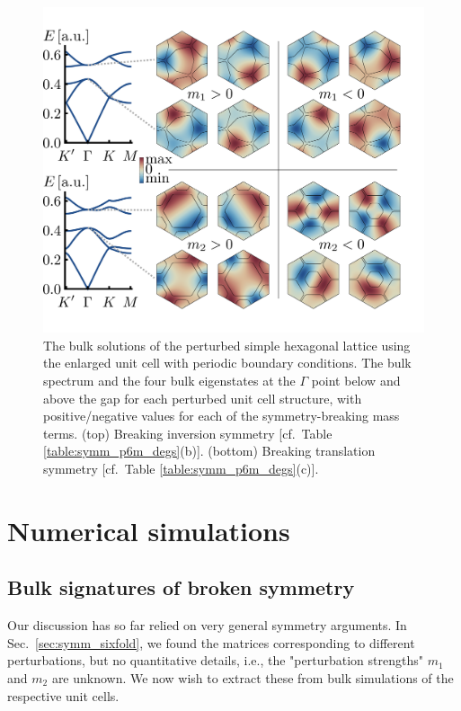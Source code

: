 \begin{figure} [h!]
 	\centering
 	\hspace*{-5mm}
 	\includegraphics{figures/hoti/fig2.png}
 	\caption{The bulk solutions of the perturbed simple hexagonal lattice using the enlarged unit cell with periodic boundary conditions. The bulk spectrum and the four bulk eigenstates at the $\Gamma$ point below and above the gap for each perturbed unit cell structure, with positive/negative values for each of the symmetry-breaking mass terms. (top) Breaking inversion symmetry [cf.~Table \ref{table:symm_p6m_degs}(b)]. (bottom) Breaking translation symmetry [cf.~Table \ref{table:symm_p6m_degs}(c)].}
 	\label{fig:hoti_bulk_sols}
\end{figure}

\section{Numerical simulations}

\subsection{Bulk signatures of broken symmetry} \label{sec:hoti_bulk}

Our discussion has so far relied on very general symmetry arguments. In Sec.~\ref{sec:symm_sixfold}, we found the matrices corresponding to different perturbations, but no quantitative details, i.e., the "perturbation strengths" $m_1$ and $m_2$ are unknown. We now wish to extract these from bulk simulations of the respective unit cells.

